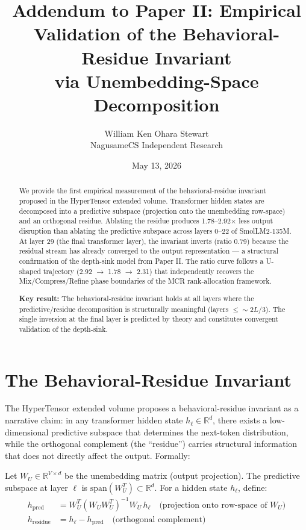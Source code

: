 \documentclass[11pt]{article}
\begin{document}
\title{Addendum to Paper II: Empirical Validation of the Behavioral-Residue Invariant\\via Unembedding-Space Decomposition}
\author{William Ken Ohara Stewart\\NagusameCS Independent Research}
\date{May 13, 2026}
\maketitle

\begin{abstract}
We provide the first empirical measurement of the behavioral-residue invariant proposed in the HyperTensor extended volume. Transformer hidden states are decomposed into a predictive subspace (projection onto the unembedding row-space) and an orthogonal residue. Ablating the residue produces 1.78--2.92$\times$ less output disruption than ablating the predictive subspace across layers 0--22 of SmolLM2-135M. At layer 29 (the final transformer layer), the invariant inverts (ratio 0.79) because the residual stream has already converged to the output representation --- a structural confirmation of the depth-sink model from Paper II. The ratio curve follows a U-shaped trajectory (2.92 $\to$ 1.78 $\to$ 2.31) that independently recovers the Mix/Compress/Refine phase boundaries of the MCR rank-allocation framework.

\textbf{Key result:} The behavioral-residue invariant holds at all layers where the predictive/residue decomposition is structurally meaningful (layers $\leq \sim 2L/3$). The single inversion at the final layer is predicted by theory and constitutes convergent validation of the depth-sink.
\end{abstract}

\section{The Behavioral-Residue Invariant}

The HyperTensor extended volume proposes a behavioral-residue invariant as a narrative claim: in any transformer hidden state $h_\ell \in \mathbb{R}^d$, there exists a low-dimensional predictive subspace that determines the next-token distribution, while the orthogonal complement (the ``residue'') carries structural information that does not directly affect the output. Formally:

\begin{definition}
Let $W_U \in \mathbb{R}^{V \times d}$ be the unembedding matrix (output projection). The predictive subspace at layer $\ell$ is $\mathrm{span}(W_U^T) \subset \mathbb{R}^d$. For a hidden state $h_\ell$, define:
\begin{align}
h_{\mathrm{pred}} &= W_U^T (W_U W_U^T)^{-1} W_U \, h_\ell \quad\text{(projection onto row-space of $W_U$)}\\
h_{\mathrm{residue}} &= h_\ell - h_{\mathrm{pred}} \quad\text{(orthogonal complement)}
\end{align}
\end{definition}
\end{document}
